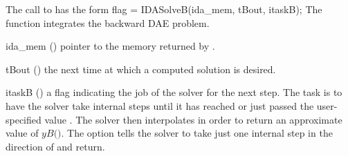 The call to  has the form
{
  flag = IDASolveB(ida\_mem, tBout, itaskB);
}
{
  The function  integrates the backward DAE problem.
}
{
  \begin{args}
  \item[ida\_mem] ()
    pointer to the {\idas} memory returned by .
  \item[tBout] ()
    the next time at which a computed solution is desired.
  \item[itaskB] ()
    a flag indicating the job of the solver for the next step.
    The  task is to have the solver take internal steps until
    it has reached or just passed the user-specified value .
    The solver then interpolates in order to
    return an approximate value of $yB($$)$.
    The  option tells the solver to take just one internal
    step in the direction of  and return.
  \end{args}
}
